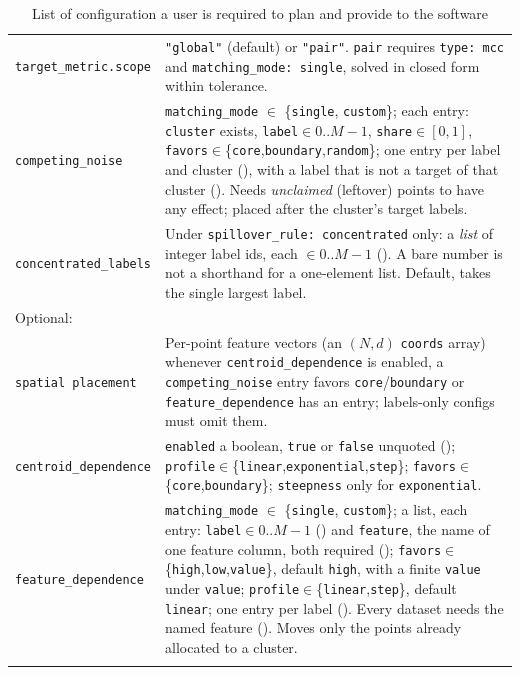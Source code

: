 \documentclass[a4paper,11pt]{article}
\newcommand{\vcode}[1]{\textcolor{valred}{\bfseries\ttfamily #1}}
\newcommand{\kcode}[1]{\textcolor{keyorange}{\bfseries\ttfamily #1}}
\begin{document}
\begin{longtable}{@{}L{4.2cm} L{12.0cm}@{}}
\texttt{target\_metric.scope} & \texttt{"global"} (default) or \texttt{"pair"}. \texttt{pair} requires \texttt{type: mcc} and \texttt{matching\_mode: single}, solved in closed form within tolerance. \\
\texttt{competing\_noise} & \texttt{matching\_mode} $\in$ \{\texttt{single}, \texttt{custom}\}; each entry: \texttt{cluster} exists, \texttt{label}$\in 0..M{-}1$, \texttt{share}$\in[0,1]$, \texttt{favors}$\in$\{\texttt{core},\texttt{boundary},\texttt{random}\}; one entry per label and cluster (\vcode{142}), with a label that is not a target of that cluster (\vcode{144}). Needs \emph{unclaimed} (leftover) points to have any effect; placed after the cluster's target labels. \\
\texttt{concentrated\_labels} & Under \texttt{spillover\_rule: concentrated} only: a \emph{list} of integer label ids, each $\in 0..M{-}1$ (\vcode{128}). A bare number is not a shorthand for a one-element list. Default, takes the single largest label. \\
\newpage
Optional:\\

\texttt{spatial placement} & Per-point feature vectors (an $(N,d)$ \texttt{coords} array) whenever \texttt{centroid\_dependence} is enabled, a \texttt{competing\_noise} entry favors \texttt{core}/\texttt{boundary} or \texttt{feature\_dependence} has an entry; labels-only configs must omit them. \\
\texttt{centroid\_dependence} & \texttt{enabled} a boolean, \texttt{true} or \texttt{false} unquoted (\vcode{141}); \texttt{profile}$\in$\{\texttt{linear},\texttt{exponential},\texttt{step}\}; \texttt{favors}$\in$\{\texttt{core},\texttt{boundary}\}; \texttt{steepness} only for \texttt{exponential}. \\
\texttt{feature\_dependence} & \texttt{matching\_mode} $\in$ \{\texttt{single}, \texttt{custom}\}; a list, each entry: \texttt{label}$\in 0..M{-}1$ (\vcode{104}) and \texttt{feature}, the name of one feature column, both required (\kcode{207}); \texttt{favors}$\in$\{\texttt{high},\texttt{low},\texttt{value}\}, default \texttt{high}, with a finite \texttt{value} under \texttt{value}; \texttt{profile}$\in$\{\texttt{linear},\texttt{step}\}, default \texttt{linear}; one entry per label (\vcode{141}). Every dataset needs the named feature (\vcode{125}). Moves only the points already allocated to a cluster. \\
\bottomrule
\caption{List of configuration a user is required to plan and provide to the software}
\end{longtable}
\end{document}
